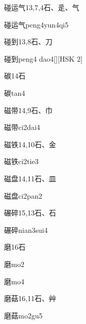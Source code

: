 \begin{entry}{碰运气}{13,7,4}{⽯、⾡、⽓}
  \begin{phonetics}{碰运气}{peng4yun4qi5}
  \end{phonetics}
\end{entry}

\begin{entry}{碰到}{13,8}{⽯、⼑}
  \begin{phonetics}{碰到}{peng4 dao4}[][HSK 2]
  \end{phonetics}
\end{entry}

\begin{entry}{碳}{14}{⽯}
  \begin{phonetics}{碳}{tan4}
  \end{phonetics}
\end{entry}

\begin{entry}{磁带}{14,9}{⽯、⼱}
  \begin{phonetics}{磁带}{ci2dai4}
  \end{phonetics}
\end{entry}

\begin{entry}{磁铁}{14,10}{⽯、⾦}
  \begin{phonetics}{磁铁}{ci2tie3}
  \end{phonetics}
\end{entry}

\begin{entry}{磁盘}{14,11}{⽯、⽫}
  \begin{phonetics}{磁盘}{ci2pan2}
  \end{phonetics}
\end{entry}

\begin{entry}{碾碎}{15,13}{⽯、⽯}
  \begin{phonetics}{碾碎}{nian3sui4}
  \end{phonetics}
\end{entry}

\begin{entry}{磨}{16}{⽯}
  \begin{phonetics}{磨}{mo2}
  \end{phonetics}
  \begin{phonetics}{磨}{mo4}
  \end{phonetics}
\end{entry}

\begin{entry}{磨菇}{16,11}{⽯、⾋}
  \begin{phonetics}{磨菇}{mo2gu5}
  \end{phonetics}
\end{entry}


